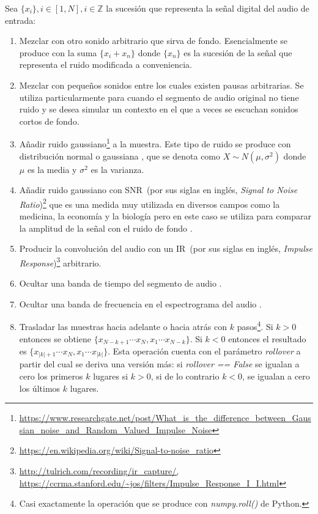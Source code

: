 Sea $\{x_i\}, i \in [1, N], i \in \mathbb{Z}$ la sucesi\'on que representa la se\~nal digital del audio de entrada:
\begin{enumerate}
\item Mezclar con otro sonido arbitrario que sirva de fondo. Esencialmente se produce con la suma $\{x_i + x_n\}$ donde $\{x_n\}$ es la sucesi\'on de la se\~nal que representa el ruido modificada a conveniencia.
\item Mezclar con peque\~nos  sonidos entre los cuales existen pausas arbitrarias. Se utiliza particularmente para cuando el segmento de audio original no tiene ruido y se desea simular un contexto en el que a veces se escuchan sonidos cortos de fondo.
\item A\~nadir ruido gaussiano\footnote{\url{https://www.researchgate.net/post/What_is_the_difference_between_Gaussian_noise_and_Random_Valued_Impulse_Noise}} a la muestra. Este tipo de ruido se produce con  distribuci\'on normal o gaussiana \cite{ross2009first}, que se denota como $X \sim N(\mu, \sigma^2)$ donde $\mu$ es la media y $\sigma^2$ es la varianza.
\item A\~nadir ruido gaussiano con SNR~(por sus siglas en ingl\'es, \emph{Signal to Noise Ratio})\footnote{\url{https://en.wikipedia.org/wiki/Signal-to-noise_ratio}} que es una medida muy utilizada en diversos campos como la medicina, la econom\'ia y la biolog\'ia pero en este caso se utiliza para comparar la amplitud de la se\~nal con el ruido de fondo \cite{thangjai2019confidence}.
\item Producir la convoluci\'on del audio con un IR~(por sus siglas en ingl\'es, \emph{Impulse Response})\footnote{\url{http://tulrich.com/recording/ir_capture/, https://ccrma.stanford.edu/~jos/filters/Impulse_Response_I_I.html}} arbitrario.
\item Ocultar una banda de tiempo del segmento de audio \cite{park2019specaugment}.
\item Ocultar una banda de frecuencia en el espectrograma del audio \cite{park2019specaugment}. 
\item Trasladar las muestras hacia adelante o hacia atr\'as con $k$ pasos\footnote{Casi exactamente la operaci\'on que se produce con \textit{numpy.roll()} de Python.}. Si $k>0$ entonces se obtiene $\{x_{N-k+1}\cdots x_N, x_1\cdots x_{N-k}\}$. Si $k<0$ entonces el resultado es $\{x_{|k|+1}\cdots x_N, x_1\cdots x_{|k|}\}$. Esta operaci\'on cuenta con el par\'ametro \textit{rollover} a partir del cual se deriva una versi\'on m\'as: si \textit{rollover == False} se igualan a cero los primeros $k$ lugares si $k>0$, si de lo contrario $k<0$, se igualan a cero los \'ultimos $k$ lugares.

\end{enumerate}
